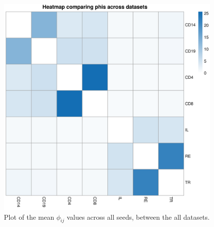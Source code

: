 \documentclass[12pt]{article} %
\begin{document}
	\begin{figure}[h]
		\centering
		\includegraphics[scale=0.75]{Images/Biology_data/Set_250/All_datasets/Phi_heatmap_1.png}
		\caption{Plot of the mean $\phi_{ij}$ values across all seeds, between the all datasets.}
		\label{fig:results:cedar_1:mdi_phi_heatmap}
	\end{figure}
	
	\newpage
	
	
%
\end{document}
